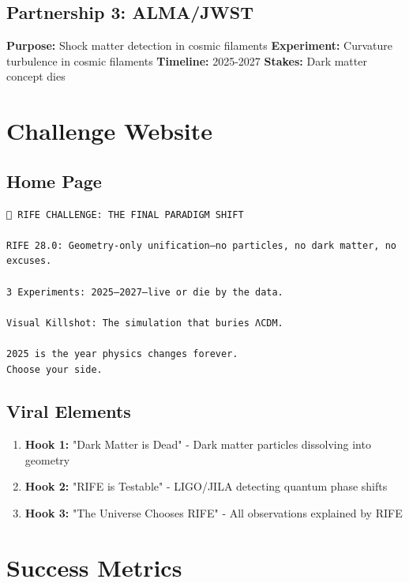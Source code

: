 \documentclass[11pt]{report}
\begin{document}
\subsection{Partnership 3: ALMA/JWST}
\textbf{Purpose:} Shock matter detection in cosmic filaments
\textbf{Experiment:} Curvature turbulence in cosmic filaments
\textbf{Timeline:} 2025-2027
\textbf{Stakes:} Dark matter concept dies

\section{Challenge Website}

\subsection{Home Page}
\begin{verbatim}
🚀 RIFE CHALLENGE: THE FINAL PARADIGM SHIFT

RIFE 28.0: Geometry-only unification—no particles, no dark matter, no excuses.

3 Experiments: 2025–2027—live or die by the data.

Visual Killshot: The simulation that buries ΛCDM.

2025 is the year physics changes forever.
Choose your side.
\end{verbatim}

\subsection{Viral Elements}
\begin{enumerate}
\item \textbf{Hook 1:} "Dark Matter is Dead" - Dark matter particles dissolving into geometry
\item \textbf{Hook 2:} "RIFE is Testable" - LIGO/JILA detecting quantum phase shifts
\item \textbf{Hook 3:} "The Universe Chooses RIFE" - All observations explained by RIFE
\end{enumerate}

\section{Success Metrics}
\end{document}
